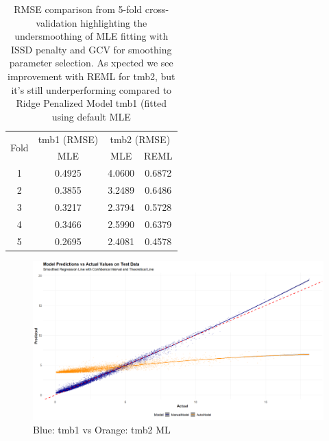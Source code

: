 \documentclass[12pt, twoside,hidelinks]{article}
\theoremstyle{definition}
\numberwithin{equation}{section}
\begin{document}
\begin{table}[H]
\centering
\caption{RMSE comparison from 5-fold cross-validation highlighting the undersmoothing of MLE fitting with ISSD penalty and GCV for smoothing parameter selection. As xpected we see improvement with REML for tmb2, but it's still underperforming compared to Ridge Penalized Model tmb1 (fitted using default MLE}
\begin{tabular}{|c|c|cc|}
\hline
\multirow{2}{*}{Fold} & \multicolumn{1}{c|}{tmb1 (RMSE)} & \multicolumn{2}{c|}{tmb2 (RMSE)} \\
                      & MLE                              & MLE            & REML           \\ \hline
1                     & 0.4925                           & 4.0600         & 0.6872         \\
2                     & 0.3855                           & 3.2489         & 0.6486         \\
3                     & 0.3217                           & 2.3794         & 0.5728         \\
4                     & 0.3466                           & 2.5990         & 0.6379         \\
5                     & 0.2695                           & 2.4081         & 0.4578         \\ \hline
\end{tabular}
\end{table}


\begin{figure}[H]
\centering
\includegraphics[width=\textwidth]{visuals/colour_line_mle.png}
\caption{Blue: tmb1 vs Orange: tmb2 ML}
\label{fig:mle}
\end{figure}
\end{document}
